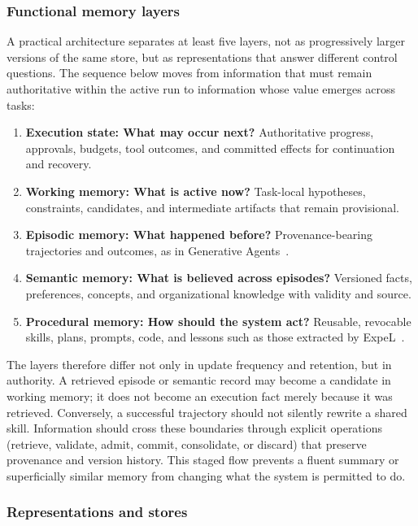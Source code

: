 \subsubsection{Functional memory layers}

A practical architecture separates at least five layers, not as progressively larger versions of the same store, but as representations that answer different control questions. The sequence below moves from information that must remain authoritative within the active run to information whose value emerges across tasks:
\begin{enumerate}
    \item \textbf{Execution state: What may occur next?} Authoritative progress, approvals, budgets, tool outcomes, and committed effects for continuation and recovery.
    \item \textbf{Working memory: What is active now?} Task-local hypotheses, constraints, candidates, and intermediate artifacts that remain provisional.
    \item \textbf{Episodic memory: What happened before?} Provenance-bearing trajectories and outcomes, as in Generative Agents~\cite{park2023generativeagents}.
    \item \textbf{Semantic memory: What is believed across episodes?} Versioned facts, preferences, concepts, and organizational knowledge with validity and source.
    \item \textbf{Procedural memory: How should the system act?} Reusable, revocable skills, plans, prompts, code, and lessons such as those extracted by ExpeL~\cite{zhao2024expel}.
\end{enumerate}
The layers therefore differ not only in update frequency and retention, but in authority. A retrieved episode or semantic record may become a candidate in working memory; it does not become an execution fact merely because it was retrieved. Conversely, a successful trajectory should not silently rewrite a shared skill. Information should cross these boundaries through explicit operations (retrieve, validate, admit, commit, consolidate, or discard) that preserve provenance and version history. This staged flow prevents a fluent summary or superficially similar memory from changing what the system is permitted to do.

\subsubsection{Representations and stores}


